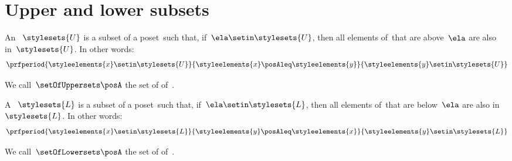 
\section{Upper and lower subsets}
\label{sec:UpperLowerSets}


\begin{definition}
    \label{def:upperset}
    An ~$\stylesets{U}$ is a subset of a poset~\posA such that, if~$\ela \setin \stylesets{U}$, then all elements of~\posA that are above~$\ela$ are also in~$\stylesets{U}$.
    In other words:
    \begin{equation}
        \prfperiod{\styleelements{x}\setin \stylesets{U}}{\styleelements{x}\posAleq \styleelements{y}}{\styleelements{y}\setin \stylesets{U}}
    \end{equation}
\end{definition}
We call~$\setOfUppersets \posA$ the set of  of~\posA.

\begin{definition}
    \label{def:lowerset}
    A ~$\stylesets{L}$ is a subset of a poset~\posA such that, if~$\ela \setin \stylesets{L}$, then all elements of~\posA that are below~$\ela$ are also in~$\stylesets{L}$.
    In other words:
    \begin{equation}
        \prfperiod{\styleelements{x}\setin \stylesets{L}}{\styleelements{y}\posAleq \styleelements{x}}{\styleelements{y}\setin \stylesets{L}}
    \end{equation}
\end{definition}
We call~$\setOfLowersets\posA$ the set of  of~\posA.
%

